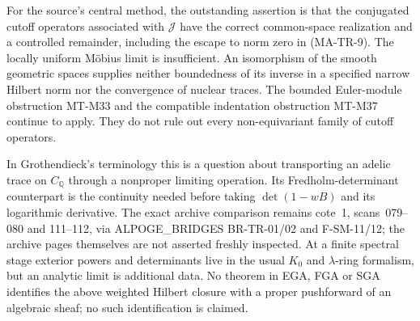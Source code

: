 For the source's central method, the outstanding assertion is that
the conjugated cutoff operators associated with $\mathcal J$ have
the correct common-space realization and a controlled remainder,
including the escape to norm zero in (MA-TR-9). The locally uniform
M\"obius limit is insufficient. An isomorphism of the smooth
geometric spaces supplies neither boundedness of its inverse in a
specified narrow Hilbert norm nor the convergence of nuclear traces.
The bounded Euler-module obstruction MT-M33 and the compatible
indentation obstruction MT-M37 continue to apply. They do not rule
out every non-equivariant family of cutoff operators.

In Grothendieck's terminology this is a question about transporting
an adelic trace on $C_{\mathbb Q}$ through a nonproper limiting
operation. Its Fredholm-determinant counterpart is the continuity
needed before taking $\det(1-wB)$ and its logarithmic derivative.
The exact archive comparison remains cote~1, scans~079--080 and
111--112, via ALPOGE\_BRIDGES BR-TR-01/02 and F-SM-11/12;
the archive pages themselves are not asserted freshly inspected.
At a finite spectral stage exterior powers and determinants live
in the usual $K_0$ and $\lambda$-ring formalism, but an analytic
limit is additional data. No theorem in EGA, FGA or SGA identifies
the above weighted Hilbert closure with a proper pushforward of
an algebraic sheaf; no such identification is claimed.
